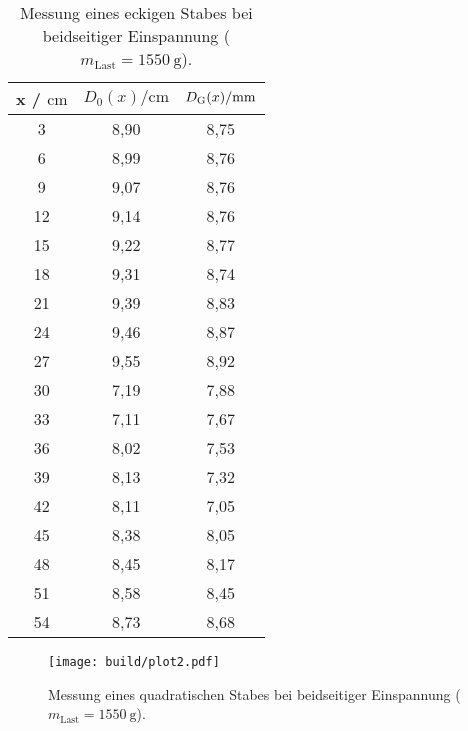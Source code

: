 \sloppy
\begin{table}[H]
  \centering
  \caption{Messung eines eckigen Stabes bei beidseitiger Einspannung ($m_{\text{Last}} = \SI{1550}{\gram}$).}
  \label{tab:werte3}
  \begin{tabular}{c c c}
    \toprule
    x / $\si{\centi\meter} $ & $ D_0(x) / \si{\centi\meter}$ & $D_{\text G}(x) / \si{\milli\meter}$ \\
    \midrule
    3 & 8,90 & 8,75 \\
    6 & 8,99 & 8,76 \\
    9 & 9,07 & 8,76 \\
    12 & 9,14 & 8,76 \\
    15 & 9,22 & 8,77 \\
    18 & 9,31 & 8,74 \\
    21 & 9,39 & 8,83 \\
    24 & 9,46 & 8,87 \\
    27 & 9,55 & 8,92 \\
    30 & 7,19 & 7,88 \\
    33 & 7,11 & 7,67 \\
    36 & 8,02 & 7,53 \\
    39 & 8,13 & 7,32 \\
    42 & 8,11 & 7,05 \\
    45 & 8,38 & 8,05 \\
    48 & 8,45 & 8,17 \\
    51 & 8,58 & 8,45 \\
    54 & 8,73 & 8,68 \\
    \bottomrule
  \end{tabular}
\end{table}

\sloppy
\begin{figure}[H]
  \centering
  \texttt{[image: build/plot2.pdf]}
  \caption{Messung eines quadratischen Stabes bei beidseitiger Einspannung ($m_{\text{Last}} = \SI{1550}{\gram}$).}
  \label{fig:plot2}
\end{figure}

